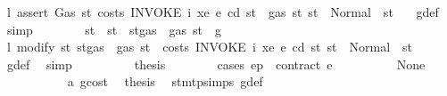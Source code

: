 \begin{isabellebody}
\ l{}{\isacharcolon}{\kern0pt}\ {\isachardoublequoteopen}assert\ Gas\ {\isacharparenleft}{\kern0pt}{\isasymlambda}st{\isachardot}{\kern0pt}\ costs\ {\isacharparenleft}{\kern0pt}INVOKE\ i\ xe{\isacharparenright}{\kern0pt}\ e\ cd\ st\ {\isacharless}{\kern0pt}\ gas\ st{\isacharparenright}{\kern0pt}\ st\ {\isacharequal}{\kern0pt}\ Normal\ {\isacharparenleft}{\kern0pt}{\isacharparenleft}{\kern0pt}{\isacharparenright}{\kern0pt}{\isacharcomma}{\kern0pt}\ st{\isacharparenright}{\kern0pt}\ {\isachardoublequoteclose}\ \isamarkupfalse%
\ g{\isacharunderscore}{\kern0pt}def\ \isamarkupfalse%
\ simp\isanewline
\ \ \ \ \ \ \isamarkupfalse%
\ st{\isacharprime}{\kern0pt}\ \ {\isachardoublequoteopen}st{\isacharprime}{\kern0pt}\ {\isacharequal}{\kern0pt}\ st{\isasymlparr}gas\ {\isacharcolon}{\kern0pt}{\isacharequal}{\kern0pt}\ gas\ st\ {\isacharminus}{\kern0pt}\ g{\isasymrparr}{\isachardoublequoteclose}\isanewline
\ \ \ \ \ \ \isamarkupfalse%
\ \isamarkupfalse%
\ l{}{\isacharcolon}{\kern0pt}\ {\isachardoublequoteopen}modify\ {\isacharparenleft}{\kern0pt}{\isasymlambda}st{\isachardot}{\kern0pt}\ st{\isasymlparr}gas\ {\isacharcolon}{\kern0pt}{\isacharequal}{\kern0pt}\ gas\ st\ {\isacharminus}{\kern0pt}\ costs\ {\isacharparenleft}{\kern0pt}INVOKE\ i\ xe{\isacharparenright}{\kern0pt}\ e\ cd\ st{\isasymrparr}{\isacharparenright}{\kern0pt}\ st\ {\isacharequal}{\kern0pt}\ Normal\ {\isacharparenleft}{\kern0pt}{\isacharparenleft}{\kern0pt}{\isacharparenright}{\kern0pt}{\isacharcomma}{\kern0pt}\ st{\isacharprime}{\kern0pt}{\isacharparenright}{\kern0pt}{\isachardoublequoteclose}\ \isamarkupfalse%
\ g{\isacharunderscore}{\kern0pt}def\ \isamarkupfalse%
\ simp\isanewline
\ \ \ \ \ \ \isamarkupfalse%
\ \isamarkupfalse%
\ {\isacharquery}{\kern0pt}thesis\isanewline
\ \ \ \ \ \ \isamarkupfalse%
\ {\isacharparenleft}{\kern0pt}cases\ {\isachardoublequoteopen}ep\ {\isachardollar}{\kern0pt}{\isachardollar}{\kern0pt}\ contract\ e{\isachardoublequoteclose}{\isacharparenright}{\kern0pt}\isanewline
\ \ \ \ \ \ \ \ \isamarkupfalse%
\ None\isanewline
\ \ \ \ \ \ \ \ \isamarkupfalse%
\ {}{\isacharparenleft}{\kern0pt}{}{\isacharparenright}{\kern0pt}\ a{}\ gcost\ \isamarkupfalse%
\ {\isacharquery}{\kern0pt}thesis\ \isamarkupfalse%
\ stmt{\isachardot}{\kern0pt}psimps{\isacharparenleft}{\kern0pt}{}{\isacharparenright}{\kern0pt}\ g{\isacharunderscore}{\kern0pt}def\ \isamarkupfalse%

\end{isabellebody}
